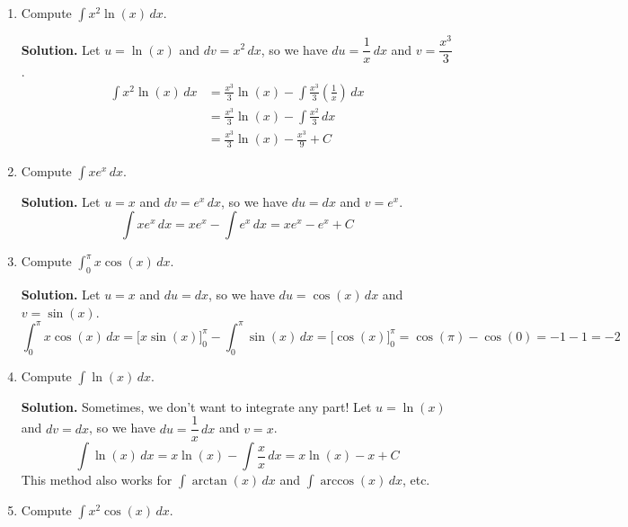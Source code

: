 \begin{Example}{}{}
    \begin{enumerate}[label=(\roman*)]
        \item Compute $ \displaystyle \int x^2\ln(x)\, d{x}  $.

              \textbf{Solution.} Let $ u=\ln(x) $ and $ dv=x^2\,dx $, so we have
              $ du=\dfrac{1}{x} \,dx $ and $ v=\dfrac{x^3}{3} $.
              \begin{align*}
                  \int x^2\ln(x)\, d{x}
                   & =\frac{x^3}{3} \ln(x)-\int \frac{x^3}{3} \left( \frac{1}{x} \right) \, d{x} \\
                   & =\frac{x^3}{3} \ln(x)-\int \frac{x^2}{3}\, d{x}                             \\
                   & =\frac{x^3}{3} \ln(x)-\frac{x^3}{9} +C
              \end{align*}
        \item Compute $ \displaystyle \int x e^x\, d{x} $.

              \textbf{Solution.} Let $ u=x $ and $ dv=e^x\,dx $, so we have $ du=dx $ and $ v=e^x $.
              \[
                  \int x e^x\, d{x}
                  =x e^x-\int e^x\, d{x}
                  =x e^x-e^x+C
              \]
        \item Compute $ \displaystyle \int_{0}^{\pi} x\cos(x)\, d{x} $.

              \textbf{Solution.} Let $ u=x $ and $ du=dx $, so we have $ du=\cos(x)\,dx $ and $ v=\sin(x) $.
              \[
                  \int_{0}^{\pi} x\cos(x)\, d{x}
                  =\bigl[x\sin(x)\bigr]^{\pi}_{0}-\int_{0}^{\pi} \sin(x)\, d{x}
                  =\bigl[\cos(x)\bigr]^{\pi}_{0}
                  =\cos(\pi)-\cos(0)
                  =-1-1
                  =-2
              \]
        \item Compute $ \displaystyle \int \ln(x)\, d{x} $.

              \textbf{Solution.} Sometimes, we don't want to integrate any part! Let $ u=\ln(x) $
              and $ dv=dx $, so we have $ du=\dfrac{1}{x}\,dx $ and $ v=x $.
              \[
                  \int \ln(x)\, d{x}
                  =x\ln(x)-\int \frac{x}{x} \, d{x}
                  =x\ln(x)-x+C
              \]
              This method also works for $ \int \arctan(x)\, d{x} $ and
              $ \int \arccos(x)\, d{x} $, etc.
        \item Compute $ \displaystyle  \int x^2\cos(x)\, d{x} $.


\end{enumerate}
\end{Example}
